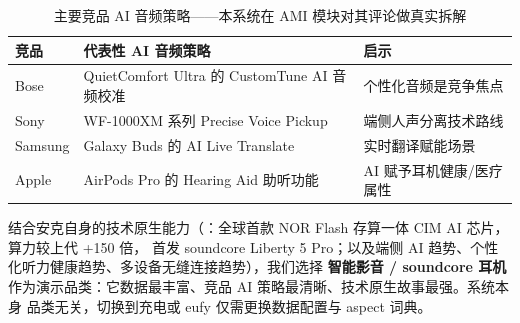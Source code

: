 \begin{table}[h]\centering\small
\renewcommand{\arraystretch}{1.2}
\begin{tabularx}{\linewidth}{p{2.2cm} p{5.2cm} X}
\toprule
\textbf{竞品} & \textbf{代表性 AI 音频策略} & \textbf{启示} \\
\midrule
Bose & QuietComfort Ultra 的 CustomTune AI 音频校准 & 个性化音频是竞争焦点 \\
Sony & WF-1000XM 系列 Precise Voice Pickup & 端侧人声分离技术路线 \\
Samsung & Galaxy Buds 的 AI Live Translate & 实时翻译赋能场景 \\
Apple & AirPods Pro 的 Hearing Aid 助听功能 & AI 赋予耳机健康/医疗属性 \\
\bottomrule
\end{tabularx}
\caption{主要竞品 AI 音频策略——本系统在 AMI 模块对其评论做真实拆解}
\end{table}

结合安克自身的技术原生能力（：全球首款 NOR Flash 存算一体 CIM AI 芯片，算力较上代 +150 倍，
首发 soundcore Liberty 5 Pro；以及端侧 AI 趋势、个性化听力健康趋势、多设备无缝连接趋势），我们选择
\textbf{智能影音 / soundcore 耳机}作为演示品类：它数据最丰富、竞品 AI 策略最清晰、技术原生故事最强。系统本身
品类无关，切换到充电或 eufy 仅需更换数据配置与 aspect 词典。
